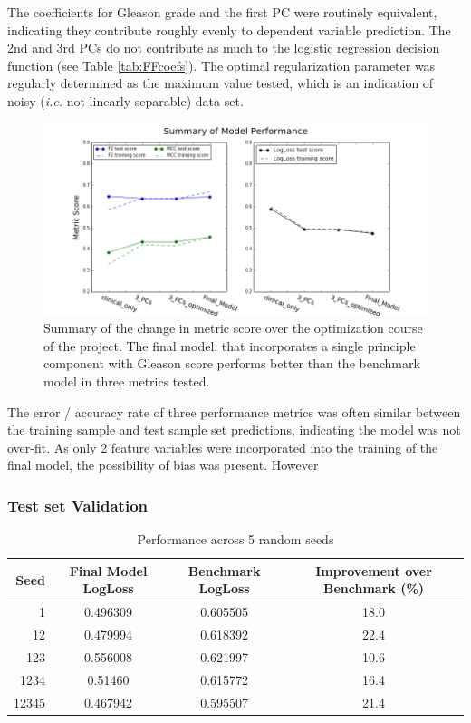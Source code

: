 \documentclass[final]{article}
\begin{document}
The coefficients for Gleason grade and the first PC were routinely equivalent,
indicating they contribute roughly evenly to dependent variable prediction.  The
2nd and 3rd PCs do not contribute as much to the logistic regression decision
function (see Table \ref{tab:FFcoefs}).  The optimal regularization parameter
was regularly determined as the maximum value tested, which is an indication of
noisy (\textit{i.e.} not linearly separable) data set.

\begin{figure}[h]
  \centering
  \includegraphics[width=\textwidth]{FF}
  \caption{Summary of the change in metric score over the optimization course of the project.  The final model, that incorporates a single principle component with Gleason score performs better than the benchmark model in three metrics tested.\label{fig:FM}}
\end{figure}

The error / accuracy rate of three performance metrics was often similar
between the training sample and test sample set predictions, indicating the
model was not over-fit.  As only 2 feature  variables were incorporated into the
training of the final model, the possibility of bias was present.  However

\subsubsection{Test set Validation}

\begin{table}[h]
\centering
\caption{Performance across 5 random seeds\label{tab:performance}}
\begin{tabular}[h]{ r c c c }
\hline
Seed & Final Model LogLoss & Benchmark LogLoss & Improvement over Benchmark (\%) \\  \hline
1 & 0.496309 & 0.605505 & 18.0 \\
12 & 0.479994 & 0.618392 & 22.4 \\
123 & 0.556008 & 0.621997 & 10.6 \\
1234 & 0.51460 & 0.615772 & 16.4 \\
12345 & 0.467942 & 0.595507 & 21.4 \\
\hline
\end{tabular}
\end{table}
\end{document}
